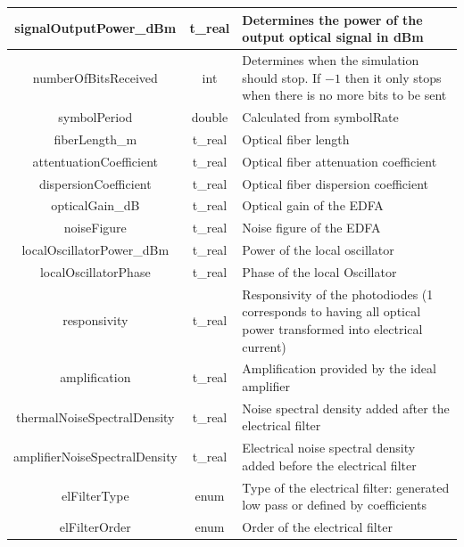 \begin{longtable}[h]{|c|c|p{5cm}|}
		signalOutputPower\_dBm        & t\_real
																	& Determines the power of the output optical
																	signal in dBm   \\ \hline
		numberOfBitsReceived          & int
																	&   Determines when the simulation should
																	stop. If $-1$ then it only stops when there is
																	no more bits to be sent   \\ \hline
		symbolPeriod                  & double
																	& Calculated from symbolRate     \\ \hline
		fiberLength\_m                 & t\_real & Optical fiber length \\\hline
		attentuationCoefficient       & t\_real & Optical fiber attenuation 
		coefficient 
		 \\\hline
		dispersionCoefficient         & t\_real & Optical fiber dispersion 
		coefficient \\\hline
		opticalGain\_dB               & t\_real & Optical gain of the EDFA \\\hline
		noiseFigure                   & t\_real & Noise figure of the EDFA \\\hline
		localOscillatorPower\_dBm     & t\_real
																	& Power of the local oscillator     \\ \hline
		localOscillatorPhase          & t\_real
																	& Phase of the local Oscillator \\\hline
		responsivity                  & t\_real
																	& Responsivity of the photodiodes (1
																	corresponds to having all optical power
																	transformed into electrical current)     \\
																	\hline
		amplification                 & t\_real
																	& Amplification provided by the ideal amplifier     \\ \hline
		thermalNoiseSpectralDensity   & t\_real
																	& Noise spectral density added after the electrical filter \\\hline
		amplifierNoiseSpectralDensity & t\_real
																	& Electrical noise spectral density added before the
																	electrical filter \\\hline
		elFilterType                  & enum
																	& Type of the electrical filter: generated low
																	pass or defined by coefficients \\\hline
		elFilterOrder                 & enum
																	& Order of the electrical filter \\\hline

\end{longtable}
